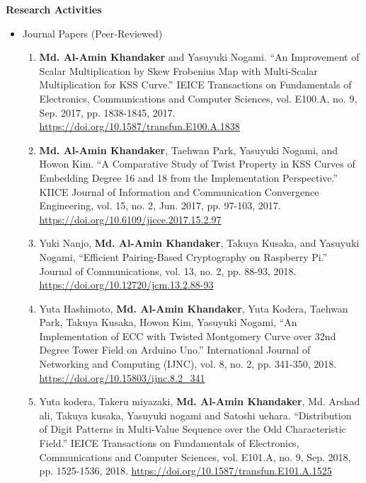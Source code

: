 \newpage
\pagestyle{plain}
\textbf{\huge Research Activities}\label{research_activity}
\vspace{10mm}\\
\begin{itemize}
\large
\item Journal Papers (Peer-Reviewed)
\normalsize
\begin{enumerate}
		
	\item \textbf{Md. Al-Amin Khandaker} and Yasuyuki Nogami. ``An Improvement of Scalar Multiplication by Skew Frobenius Map with Multi-Scalar Multiplication for KSS Curve.'' IEICE Transactions on Fundamentals of Electronics, Communications and Computer Sciences, vol. E100.A, no. 9, Sep. 2017, pp. 1838-1845, 2017. \url{https://doi.org/10.1587/transfun.E100.A.1838}
	
	\item \textbf{Md. Al-Amin Khandaker}, Taehwan Park, Yasuyuki Nogami, and Howon Kim. ``A Comparative Study of Twist Property in KSS Curves of Embedding Degree 16 and 18 from the Implementation Perspective.'' KIICE Journal of Information and Communication Convergence Engineering, vol. 15, no. 2, Jun. 2017, pp. 97-103, 2017. \url{https://doi.org/10.6109/jicce.2017.15.2.97}
	
	\item Yuki Nanjo,  \textbf{Md. Al-Amin Khandaker}, Takuya Kusaka, and Yasuyuki Nogami, ``Efficient Pairing-Based Cryptography on Raspberry Pi.'' Journal of Communications, vol. 13, no. 2, pp. 88-93, 2018.  \url{https://doi.org/10.12720/jcm.13.2.88-93} 
		
	\item Yuta Hashimoto,  \textbf{Md. Al-Amin Khandaker}, Yuta Kodera, Taehwan Park, Takuya Kusaka, Howon Kim, Yasuyuki Nogami, ``An Implementation of ECC with Twisted Montgomery Curve over 32nd Degree Tower Field on Arduino Uno.'' International Journal of Networking and Computing (IJNC), vol. 8, no. 2, pp. 341-350, 2018.
	\url{https://doi.org/10.15803/ijnc.8.2_341}
	
	\item Yuta kodera, Takeru miyazaki, \textbf{Md. Al-Amin Khandaker},  Md. Arshad ali, Takuya kusaka, Yasuyuki nogami and Satoshi uehara. ``Distribution of Digit Patterns in Multi-Value Sequence over the Odd Characteristic Field.'' IEICE Transactions on Fundamentals of Electronics, Communications and Computer Sciences, vol. E101.A, no. 9, Sep. 2018, pp. 1525-1536, 2018. \url{https://doi.org/10.1587/transfun.E101.A.1525}
	

\end{enumerate}
\end{itemize}
